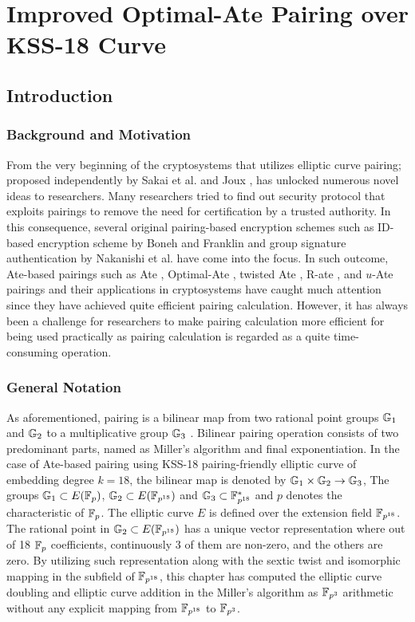 \chapter{Improved Optimal-Ate Pairing over KSS-18 Curve} 
\label{ch:optate_kss18_icisc2016}

\section{Introduction}
\label{ch:icisc2016:intro}

\subsection{Background and Motivation}
\label{sec:ch:icisc:bac_motivation}
From the very beginning of the cryptosystems that utilizes elliptic curve pairing; proposed independently by Sakai et al. \cite{EPRINT:SakKas03} and Joux \cite{JC:Joux04}, has unlocked numerous novel ideas to researchers. 
Many researchers tried to find out security protocol that exploits pairings to remove the need for certification by a trusted authority. 
In this consequence, several original pairing-based encryption schemes such as ID-based encryption scheme by  Boneh and Franklin \cite{C:BonFra01} and group signature authentication by Nakanishi et al. \cite{AC:NakFun05} have come into the focus. 
In such outcome, Ate-based pairings such as Ate \cite{DBLP:reference/crc/2005ehcc}, Optimal-Ate \cite{DBLP:journals/tit/Vercauteren10}, twisted Ate \cite{EPRINT:MKHO07},  R-ate \cite{r_ate}, and $u$-Ate \cite{PAIRING:NASKM08} pairings and their applications in cryptosystems have caught much attention since they have achieved quite efficient pairing calculation.
However, it has always been a challenge for researchers to make pairing calculation more efficient for being used practically as pairing calculation is regarded as a quite time-consuming operation. 

\subsection{General Notation}
\label{sec:ch:icisc:notation}
As aforementioned, pairing is a bilinear map from two rational point groups ${\mathbb{G}}_{1}$ and ${\mathbb{G}}_{2}$ to a multiplicative group ${\mathbb{G}}_{3}$ \cite{Silverman}.
Bilinear pairing operation consists of two predominant parts,  named as Miller's algorithm and final exponentiation.
In  the case of  Ate-based pairing using KSS-18 pairing-friendly elliptic curve of embedding degree $k=18$,  the bilinear map is denoted by ${\mathbb{G}}_{1} \times {\mathbb{G}}_{2} \rightarrow {\mathbb{G}}_{3}$,
The groups ${\mathbb{G}}_{1} \subset E(\mathbb{F}_p)$, ${\mathbb{G}}_{2} \subset E(\mathbb{F}_{p^{18}})$ and ${\mathbb{G}}_{3}  \subset \mathbb{F}^*_{p^{18}}$ and  $p$ denotes the characteristic of ${\mathbb{F}}_{p}$.
The elliptic curve $E$ is defined over the extension field $\mathbb{F}_{p^{18}}$. 
The rational point in ${\mathbb{G}}_{2} \subset E(\mathbb{F}_{p^{18}})$ has a unique vector representation where out of 18 ${\mathbb{F}}_{p}$ coefficients, continuously 3 of them are non-zero, and the others are zero. 
By utilizing such representation along with the sextic twist and isomorphic mapping in the subfield of $\mathbb{F}_{p^{18}}$, this chapter has computed the elliptic curve doubling and elliptic curve addition in the Miller's algorithm as $\mathbb{F}_{p^3}$ arithmetic without any explicit mapping from $\mathbb{F}_{p^{18}}$ to $\mathbb{F}_{p^3}$.


